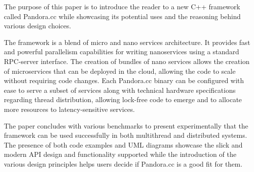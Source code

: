 The purpose of this paper is to introduce the reader to a new C++ framework called Pandora.cc while showcasing its potential uses and the reasoning behind various design choices. 

The framework is a blend of micro and nano services architecture. It provides fast and powerful parallelism capabilities for writing nanoservices using a standard RPC-server interface. The creation of bundles of nano services allows the creation of microservices that can be deployed in the cloud, allowing the code to scale without requiring code changes. Each Pandora.cc binary can be configured with ease to serve a subset of services along with technical hardware specifications regarding thread distribution, allowing lock-free code to emerge and to allocate more resources to latency-sensitive services.

The paper concludes with various benchmarks to present experimentally that the framework can be used successfully in both multithread and distributed systems. The presence of both code examples and UML diagrams showcase the slick and modern API design and functionality supported while the introduction of the various design principles helps users decide if Pandora.cc is a good fit for them.